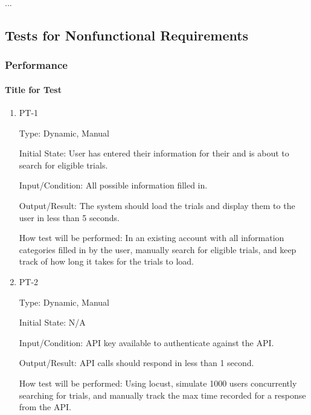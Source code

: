 \documentclass[12pt, titlepage]{article}
\begin{document}
...

\subsection{Tests for Nonfunctional Requirements}




\subsubsection{Performance}
		
\paragraph{Title for Test}

\begin{enumerate}

\item{PT-1\\}

Type: Dynamic, Manual
					
Initial State: User has entered their information for their and is about to search for eligible trials.
					
Input/Condition: All possible information filled in.
					
Output/Result: The system should load the trials and display them to the user in less than 5 seconds.
					
How test will be performed: In an existing account with all information categories filled in by the user, manually search for eligible trials, 
and keep track of how long it takes for the trials to load.
					
\item{PT-2\\}

Type: Dynamic, Manual
					
Initial State: N/A
					
Input/Condition: API key available to authenticate against the API.
					
Output/Result: API calls should respond in less than 1 second.
					
How test will be performed: Using locust, simulate 1000 users concurrently searching for trials, and manually track 
the max time recorded for a response from the API.

\end{enumerate}
\end{document}
